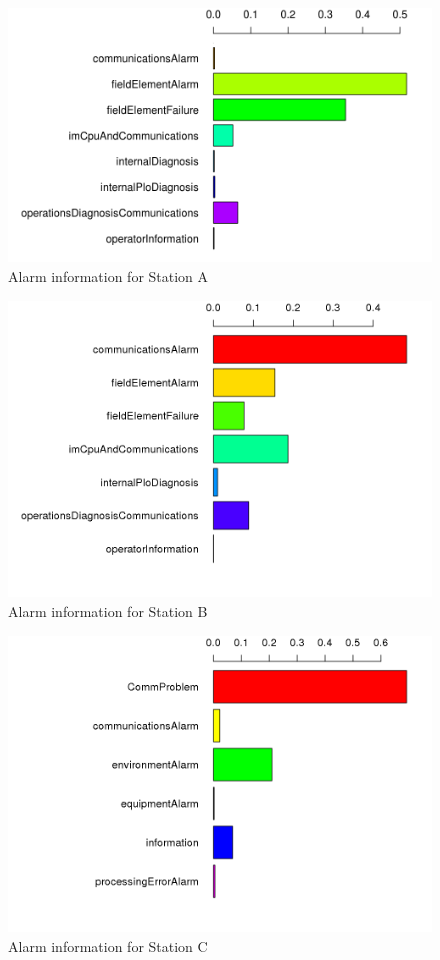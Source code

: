 \begin{figure}[htb]
 \centering
 \includegraphics[width=\textwidth]{./img/albacete_graph.png}
 \caption{Alarm information for Station A}
 \label{fig:albacete_chart}
\end{figure}
\begin{figure}[htb]
 \centering
 \includegraphics[width=\textwidth]{./img/antequera_graph.png}
 \caption{Alarm information for Station B}
 \label{fig:antequera_chart}
\end{figure}
\begin{figure}[htb]
 \centering
 \includegraphics[width=\textwidth]{./img/segovia_graph.png}
 \caption{Alarm information for Station C}
 \label{fig:segovia_chart}
\end{figure}
